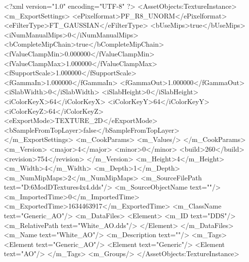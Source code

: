 <?xml version="1.0" encoding="UTF-8" ?>
<AssetObjects:TextureInstance>
	<m_ExportSettings>
		<ePixelformat>PF_R8_UNORM</ePixelformat>
		<eFilterType>FT_GAUSSIAN</eFilterType>
		<bUseMips>true</bUseMips>
		<iNumManualMips>0</iNumManualMips>
		<bCompleteMipChain>true</bCompleteMipChain>
		<fValueClampMin>0.000000</fValueClampMin>
		<fValueClampMax>1.000000</fValueClampMax>
		<fSupportScale>1.000000</fSupportScale>
		<fGammaIn>1.000000</fGammaIn>
		<fGammaOut>1.000000</fGammaOut>
		<iSlabWidth>0</iSlabWidth>
		<iSlabHeight>0</iSlabHeight>
		<iColorKeyX>64</iColorKeyX>
		<iColorKeyY>64</iColorKeyY>
		<iColorKeyZ>64</iColorKeyZ>
		<eExportMode>TEXTURE_2D</eExportMode>
		<bSampleFromTopLayer>false</bSampleFromTopLayer>
	</m_ExportSettings>
	<m_CookParams>
		<m_Values/>
	</m_CookParams>
	<m_Version>
		<major>4</major>
		<minor>0</minor>
		<build>260</build>
		<revision>754</revision>
	</m_Version>
	<m_Height>4</m_Height>
	<m_Width>4</m_Width>
	<m_Depth>1</m_Depth>
	<m_NumMipMaps>2</m_NumMipMaps>
	<m_SourceFilePath text="D:\Civ6Mod\3D\Util Textures\white4x4.dds"/>
	<m_SourceObjectName text=""/>
	<m_ImportedTime>0</m_ImportedTime>
	<m_ExportedTime>1634463917</m_ExportedTime>
	<m_ClassName text="Generic_AO"/>
	<m_DataFiles>
		<Element>
			<m_ID text="DDS"/>
			<m_RelativePath text="White_AO.dds"/>
		</Element>
	</m_DataFiles>
	<m_Name text="White_AO"/>
	<m_Description text=""/>
	<m_Tags>
		<Element text="Generic_AO"/>
		<Element text="Generic"/>
		<Element text="AO"/>
	</m_Tags>
	<m_Groups/>
</AssetObjects:TextureInstance>

 